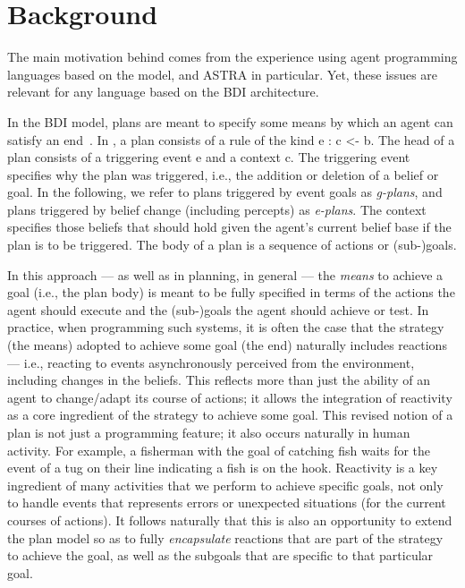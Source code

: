 \section{Background}
\label{sec:background}




The main motivation behind {\aser} comes from the experience using
agent programming languages based on the {\asl} model, {\jason} and
ASTRA in particular.
Yet, these issues are relevant for any language based on the BDI
architecture.

%
In the BDI model, plans are meant to specify some means by which an
agent can satisfy an end~\cite{Rao96}.
%
In {\asl}, a plan consists of a rule of the kind \textsf{e : c <- b}.
%
The head of a plan consists of a triggering event \textsf{e} and a
context \textsf{c}.
%
The triggering event specifies why the plan was triggered, i.e., the
addition or deletion of a belief or goal.
%
In the following, we refer to plans triggered by event goals
as \emph{g-plans}, and plans triggered by
belief change (including percepts) as \emph{e-plans}.
%
The context specifies those beliefs that should hold given the agent's
current belief base if the plan is to be triggered.
%
The body of a plan is a sequence of actions or (sub-)goals.
%

%
%
In this approach --- as well as in planning, in general --- the
\emph{means} to achieve a goal (i.e., the plan body) is meant to be
fully specified in terms of the actions the agent should execute and
the (sub-)goals the agent should achieve or test.
%
In practice, when programming such systems, it is often the case that
the strategy (the means) adopted to achieve some goal (the end)
naturally includes reactions --- i.e., reacting to events asynchronously
perceived from the environment, including changes in the beliefs.
% 
This reflects more than just the ability of an agent to change/adapt
its course of actions; it allows the integration of reactivity as a
core ingredient of the strategy to achieve some goal.
%
This revised notion of a plan is not just a programming feature; it
also occurs naturally in human activity. For example, a fisherman with
the goal of catching fish waits for the event of a tug on their line
indicating a fish is on the hook. Reactivity is a key ingredient of many
activities that we perform to achieve specific goals, not only to
handle events that represents errors or unexpected situations (for the
current courses of actions).
%
It follows naturally that this is also an opportunity to extend the
plan model so as to fully \emph{encapsulate} reactions that are
part of the strategy to achieve the goal, as well as the subgoals that
are specific to that particular goal.

